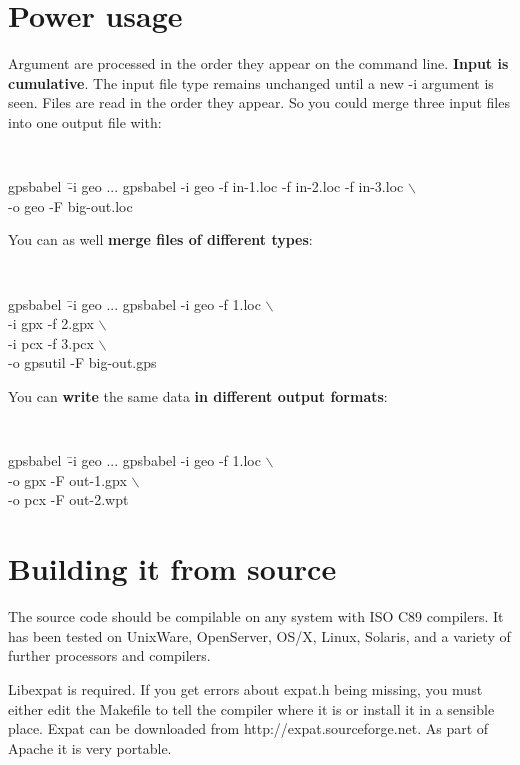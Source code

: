 \documentclass[12pt]{article}
\newcommand{\bsl}{$\backslash$}
\begin{document}
\section{Power usage}

Argument are processed in the order they appear on the command line.
{\bfseries Input is cumulative}.  The input file type remains unchanged until a 
new -i argument is seen.  Files are read in the order they appear.  
So you could merge three input files into one output file with:
{\tt \small
\begin{tabbing}
gpsbabel~\= -i geo ... \kill
gpsbabel \> -i geo -f in-1.loc -f in-2.loc -f in-3.loc \+ \bsl \\
						-o geo -F big-out.loc
\end{tabbing}
}

You can as well {\bfseries merge files of different types}:
{\tt \small
\begin{tabbing}
gpsbabel~\= -i geo ... \kill
gpsbabel \> -i geo -f 1.loc \+ \bsl \\
						-i gpx -f 2.gpx \bsl \\
						-i pcx -f 3.pcx \bsl \\
						-o gpsutil -F big-out.gps
\end{tabbing}
}

You can {\bfseries write} the same data {\bfseries in different output formats}:
{\tt \small
\begin{tabbing}
gpsbabel~\= -i geo ... \kill
gpsbabel \> -i geo -f 1.loc \+ \bsl \\
						-o gpx -F out-1.gpx \bsl \\
						-o pcx -F out-2.wpt
\end{tabbing}
}



\section{Building it from source}

The source code should be compilable on any system with ISO C89 compilers.
It has been tested on UnixWare, OpenServer, OS/X, Linux, Solaris, and
a variety of further processors and compilers.

{\sc Libexpat} is required.   If you get errors about {\sc expat.h} being
missing, you must either edit the {\sc Makefile} to tell the compiler
where it is or install it in a sensible place.   Expat can be 
downloaded from http://expat.sourceforge.net. As part of Apache
it is very portable.
\end{document}
